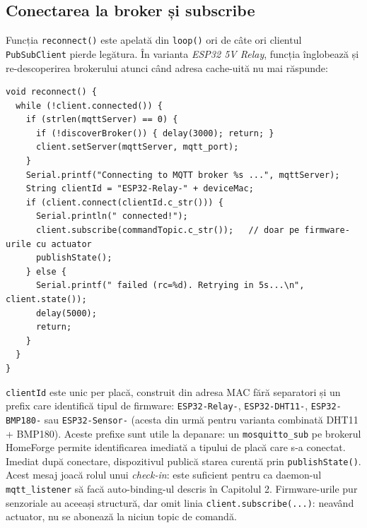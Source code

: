 \subsection{Conectarea la broker și subscribe}
Funcția \texttt{reconnect()} este apelată din \texttt{loop()} ori de câte ori clientul \texttt{PubSubClient} pierde legătura. În varianta \emph{ESP32 5V Relay}, funcția înglobează și re-descoperirea brokerului atunci când adresa cache-uită nu mai răspunde:
\begin{verbatim}
void reconnect() {
  while (!client.connected()) {
    if (strlen(mqttServer) == 0) {
      if (!discoverBroker()) { delay(3000); return; }
      client.setServer(mqttServer, mqtt_port);
    }
    Serial.printf("Connecting to MQTT broker %s ...", mqttServer);
    String clientId = "ESP32-Relay-" + deviceMac;
    if (client.connect(clientId.c_str())) {
      Serial.println(" connected!");
      client.subscribe(commandTopic.c_str());   // doar pe firmware-urile cu actuator
      publishState();
    } else {
      Serial.printf(" failed (rc=%d). Retrying in 5s...\n", client.state());
      delay(5000);
      return;
    }
  }
}
\end{verbatim}
\texttt{clientId} este unic per placă, construit din adresa MAC fără separatori și un prefix care identifică tipul de firmware: \texttt{ESP32-Relay-}, \texttt{ESP32-DHT11-}, \texttt{ESP32-BMP180-} sau \texttt{ESP32-Sensor-} (acesta din urmă pentru varianta combinată DHT11 + BMP180). Aceste prefixe sunt utile la depanare: un \texttt{mosquitto\_sub} pe brokerul HomeForge permite identificarea imediată a tipului de placă care s-a conectat. Imediat după conectare, dispozitivul publică starea curentă prin \texttt{publishState()}. Acest mesaj joacă rolul unui \emph{check-in}: este suficient pentru ca daemon-ul \texttt{mqtt\_listener} să facă auto-binding-ul descris în Capitolul 2. Firmware-urile pur senzoriale au aceeași structură, dar omit linia \texttt{client.subscribe(...)}: neavând actuator, nu se abonează la niciun topic de comandă.

